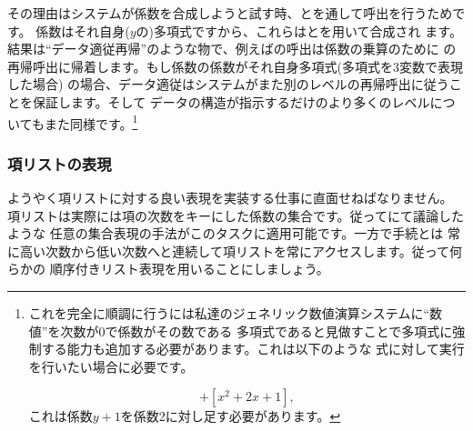その理由はシステムが係数を合成しようと試す時、とを通して呼出を行うためです。
係数はそれ自身(\( y \)の)多項式ですから、これらはとを用いて合成され
ます。結果は``データ適従再帰''のような物で、例えばの呼出は係数の乗算のために
の再帰呼出に帰着します。もし係数の係数がそれ自身多項式(多項式を3変数で表現した場合)
の場合、データ適従はシステムがまた別のレベルの再帰呼出に従うことを保証します。そして
データの構造が指示するだけのより多くのレベルについてもまた同様です。\footnote{

これを完全に順調に行うには私達のジェネリック数値演算システムに``数値''を次数が0で係数がその数である
多項式であると見做すことで多項式に強制する能力も追加する必要があります。これは以下のような
式に対して実行を行いたい場合に必要です。
\begin{comment}

\begin{example}
[x^2 + (y + 1)x + 5] + [x^2 + 2x + 1]
\end{example}

\end{comment}
\begin{displaymath}
 [x^2 + (y + 1)x + 5] + [x^2 + 2x + 1], 
\end{displaymath}
\noindent
これは係数\( y + 1 \)を係数2に対し足す必要があります。}

\subsubsection*{項リストの表現}


ようやく項リストに対する良い表現を実装する仕事に直面せねばなりません。
項リストは実際には項の次数をキーにした係数の集合です。従ってにて議論したような
任意の集合表現の手法がこのタスクに適用可能です。一方で手続とは
常に高い次数から低い次数へと連続して項リストを常にアクセスします。従って何らかの
順序付きリスト表現を用いることにしましょう。



